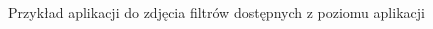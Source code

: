 \documentclass[polish,12pt]{aghthesis}
\begin{document}
\begin{itemize}
\begin{figure}[H]
    \end{figure}
    \begin{figure}[H]
    \ContinuedFloat
    \begin{adjustbox}{minipage=1.0\paperwidth, pagecenter}
    \centering
    \qquad
    \end{adjustbox}
    \caption{Przykład aplikacji do zdjęcia filtrów dostępnych z poziomu aplikacji}
    \end{figure}
    

\end{itemize}
\end{document}
